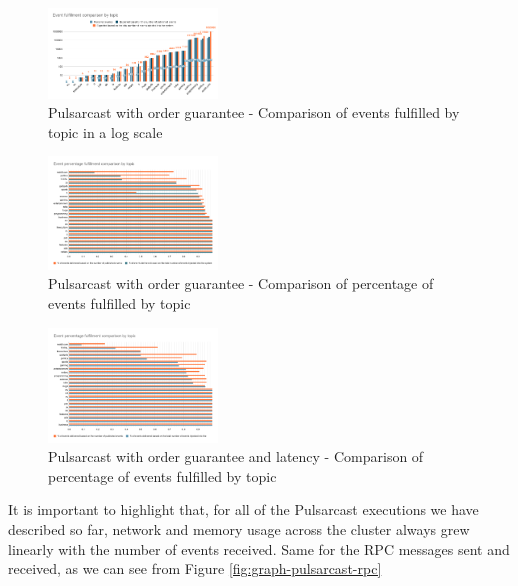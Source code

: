 \begin{figure}[!htb]
  \centering
  \includegraphics[width=0.4\textwidth]{img/graph-pulsarcast-order-event-fulfillment-comparison.png}
  \caption{Pulsarcast with order guarantee - Comparison of events fulfilled by topic in a log scale}
  \label{fig:graph-pulsarcast-order-event-fulfillment-comparison}
\end{figure}

\begin{figure}[!htb]
  \centering
  \includegraphics[width=0.4\textwidth]{img/graph-pulsarcast-order-event-percentage-fulfillment-comparison.png}
  \caption{Pulsarcast with order guarantee - Comparison of percentage of events fulfilled by topic}
  \label{fig:graph-pulsarcast-order-event-percentage-fulfillment-comparison}
\end{figure}

\begin{figure}[!htb]
  \centering
  \includegraphics[width=0.4\textwidth]{img/graph-pulsarcast-order-latency-event-percentage-fulfillment-comparison.png}
  \caption{Pulsarcast with order guarantee and latency - Comparison of percentage of events fulfilled by topic}
  \label{fig:graph-pulsarcast-order-latency-event-percentage-fulfillment-comparison}
\end{figure}

It is important to highlight that, for all of the Pulsarcast executions we have
described so far, network and memory usage across the cluster always grew
linearly with the number of events received. Same for the RPC messages sent and
received, as we can see from Figure \ref{fig:graph-pulsarcast-rpc}

